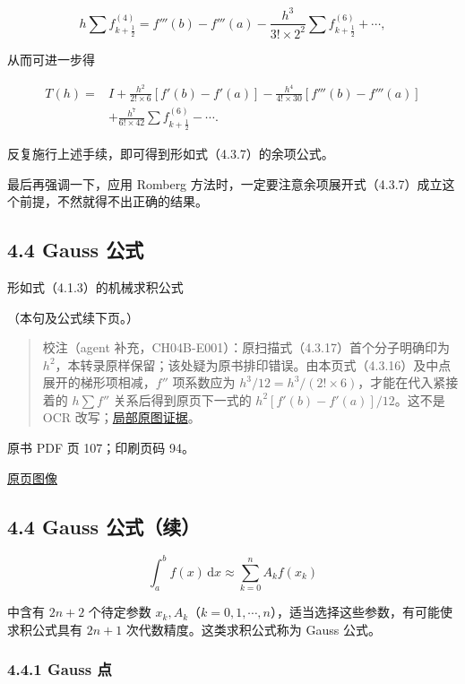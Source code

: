 \[
h\sum f^{(4)}_{k+\frac12}=f'''(b)-f'''(a)
-\frac{h^3}{3!\times2^2}\sum f^{(6)}_{k+\frac12}+\cdots,
\]

从而可进一步得

\[
\begin{aligned}
T(h)={}&I+\frac{h^2}{2!\times6}[f'(b)-f'(a)]
-\frac{h^4}{4!\times30}[f'''(b)-f'''(a)]\\
&+\frac{h^7}{6!\times42}\sum f^{(6)}_{k+\frac12}-\cdots.
\end{aligned}
\tag{4.3.18}
\]

反复施行上述手续，即可得到形如式（4.3.7）的余项公式。

最后再强调一下，应用 Romberg 方法时，一定要注意余项展开式（4.3.7）成立这个前提，不然就得不出正确的结果。

\subsection{4.4 Gauss 公式}\label{ch04b-gauss-ux516cux5f0f}

形如式（4.1.3）的机械求积公式

（本句及公式续下页。）

\begin{quote}
校注（agent 补充，CH04B-E001）：原扫描式（4.3.17）首个分子明确印为 \(h^2\)，本转录原样保留；该处疑为原书排印错误。由本页式（4.3.16）及中点展开的梯形项相减，\(f''\) 项系数应为 \(h^3/12=h^3/(2!\times6)\)，才能在代入紧接着的 \(h\sum f''\) 关系后得到原页下一式的 \(h^2[f'(b)-f'(a)]/12\)。这不是 OCR 改写；\href{verified/assets/ch04b/review-p106-middle.png}{局部原图证据}。
\end{quote}

\clearpage

原书 PDF 页 107；印刷页码 94。

\href{source-images/pdf-107.jpeg}{原页图像}

\subsection{4.4 Gauss 公式（续）}\label{ch04b-gauss-ux516cux5f0fux7eed}

\[
\int_a^b f(x)\,\mathrm{d}x\approx\sum_{k=0}^{n}A_kf(x_k)
\tag{4.4.1}
\]

中含有 \(2n+2\) 个待定参数 \(x_k,A_k\)（\(k=0,1,\cdots,n\)），适当选择这些参数，有可能使求积公式具有 \(2n+1\) 次代数精度。这类求积公式称为 Gauss 公式。

\subsubsection{4.4.1 Gauss 点}\label{ch04b-gauss-ux70b9}

